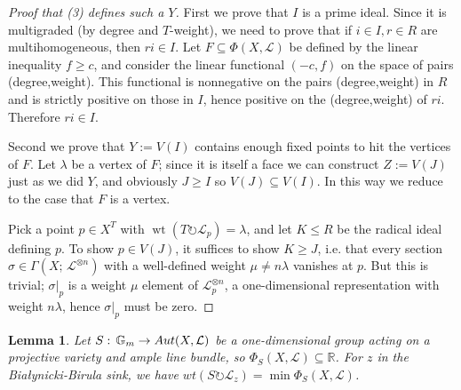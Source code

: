 \documentclass[11pt]{amsart}
\newtheorem{lemma}[Thm]{Lemma}
\theoremstyle{definition}
\DeclareMathOperator{\wt}{wt}
\newcommand{\RR}{\mathbb{R}}
\newcommand\lie[1]{{\mathfrak #1}}
\newcommand\tensor\otimes
\newcommand\calL{{\mathcal L}}
\newcommand\Gm{{\mathbb G}_m}
\newcommand\junk[1]{}
\newcommand\actson\circlearrowright
\renewcommand{\colon}{\mathrel{:}}
\renewcommand{\colon}{:\mkern\thinmuskip}
\begin{document}
\begin{proof}[Proof that (3) defines such a $Y$\!]
  \junk{
  First we need to show that $\Phi(Y,\calL)$ is a face $F$ in the usual sense,
  i.e. there is a linear functional on $\Phi(X, \calL)$ minimized
  on exactly $\Phi(Y, \calL)$. Pick a coweight $S$ defining $Y$, and
  let $\sigma$ be the corresponding functional on $\lie t^*_\RR$
  Then since $Y$ is $S$-fixed pointwise, the functional $\sigma$ is
  constant on $\Phi(Y,\calL)$ by Proposition \ref{prop:spanOfPhi}.
  By the analysis in the proof of Lemma \ref{lem:fixedPoints}(2),
  a component $Z$ of $X^S$ is the sink iff the $S$-weight $\wt(S\actson\calL_p)$,
  $p\in X^S$ is minimized on $Z$. 

  Given a face $F \subseteq \Phi_T(X,\calL)$, there is a rational functional
  $\lie t^*_\RR$ minimized exactly on $F$, i.e. a rational coweight.
  Some positive multiple of it defines an actual coweight $S$.
  }

  First we prove that $I$ is a prime ideal. Since it is multigraded
  (by degree and $T$-weight), we need to prove that if $i\in I, r\in R$ are
  multihomogeneous, then $ri \in I$. Let $F \subseteq \Phi(X,\calL)$ be
  defined by the linear inequality $f\geq c$, and consider the linear
  functional $(-c,f)$ on the space of pairs (degree,weight).
  This functional is nonnegative on the pairs (degree,weight) in $R$
  and is strictly positive on those in $I$, hence positive on
  the (degree,weight) of $ri$. Therefore $ri \in I$.

  Second we prove that $Y := V(I)$ contains enough fixed points to
  hit the vertices of $F$. Let $\lambda$ be a vertex of $F$; since it
  is itself a face we can construct $Z := V(J)$ just as we did $Y$,
  and obviously $J\geq I$ so $V(J) \subseteq V(I)$. 
  In this way we reduce to the case that $F$ is a vertex.

  Pick a point $p\in X^T$ with $\wt(T\actson \calL_p) = \lambda$,
  and let $K\leq R$ be the radical ideal defining $p$.
  To show $p \in V(J)$, it suffices to show $K \geq J$,
  i.e. that every section $\sigma \in \Gamma(X;\, \calL^{\tensor n})$
  with a well-defined weight $\mu \neq n\lambda$ vanishes at $p$.
  But this is trivial; $\sigma|_p$ is a weight $\mu$ element of
  $\calL^{\tensor n}_p$, a one-dimensional representation with weight $n\lambda$,
  hence $\sigma|_p$ must be zero.
\end{proof}

\begin{lemma}\label{lem:sink}
  Let $S\colon \Gm\to Aut(X,\calL)$ be a one-dimensional group acting on a
  projective variety and ample line bundle, so $\Phi_S(X,\calL) \subseteq \RR$.
  For $z$ in the Bia\l ynicki-Birula sink, 
  we have $wt(S\actson \calL_z) = \min\Phi_S(X,\calL)$.
\end{lemma}
\end{document}
